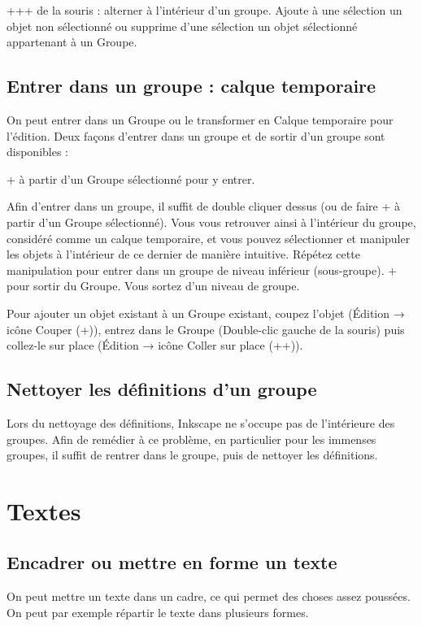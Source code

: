 \documentclass[a4paper,twoside]{article}
\begin{document}
+++ de la souris : alterner à l'intérieur d'un groupe. Ajoute à une sélection un objet non sélectionné ou supprime d'une sélection un objet sélectionné appartenant à un Groupe. 

\subsection{Entrer dans un groupe : calque temporaire}
On peut entrer dans un Groupe ou le transformer en Calque temporaire pour l'édition. Deux façons d'entrer dans un groupe et de sortir d'un groupe sont disponibles :

+ à partir d'un Groupe sélectionné pour y entrer. 

Afin d'entrer dans un groupe, il suffit de double cliquer dessus (ou de faire + à partir d'un Groupe sélectionné).  Vous vous retrouver ainsi à l'intérieur du groupe, considéré comme un calque temporaire, et vous pouvez sélectionner et manipuler les objets à l'intérieur de ce dernier de manière intuitive. Répétez cette manipulation pour entrer dans un groupe de niveau inférieur (sous-groupe). + pour sortir du Groupe. Vous sortez d'un niveau de groupe.

\begin{remarque}
Pour ajouter un objet existant à un Groupe existant, coupez l'objet (Édition → icône Couper (+)), entrez dans le Groupe (Double-clic gauche de la souris) puis collez-le sur place (Édition → icône Coller sur place (++)). 
\end{remarque}

\subsection{Nettoyer les définitions d'un groupe}
Lors du nettoyage des définitions, Inkscape ne s'occupe pas de l'intérieure des groupes. Afin de remédier à ce problème, en particulier pour les immenses groupes, il suffit de rentrer dans le groupe, puis de nettoyer les définitions.

\section{Textes}
\subsection{Encadrer ou mettre en forme un texte}
On peut mettre un texte dans un cadre, ce qui permet des choses assez poussées. On peut par exemple répartir le texte dans plusieurs formes. 
\end{document}
